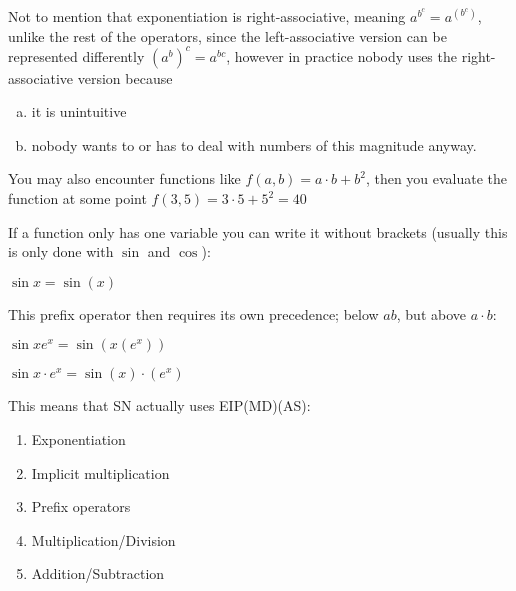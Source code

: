 \documentclass[twoside]{article}
\newcommand{\B}[1]{\left(#1\right)} %
\begin{document}
\begin{multicols*}{2}
                Not to mention that exponentiation is right-associative,
                meaning $a^{b^c} = a^{\B{b^c}}$, unlike the rest of the operators,
                since the left-associative version can be represented differently $(a^b)^c = a^{bc}$,
                however in practice nobody uses the right-associative version because
                \begin{enumerate}[a)]
                    \item it is unintuitive
                    \item nobody wants to or has to deal with numbers of this magnitude anyway.
                \end{enumerate}
            \par\vspace{5px}
                You may also encounter functions like $ f(a, b) = a \cdot b + b^2 $,
                then you evaluate the function at some point $ f(3,5) = 3\cdot5 + 5^2 = 40 $
                \par
                If a function only has one variable you can write it without brackets
                (usually this is only done with $\sin$ and $\cos$):\vspace{2px}\\
                \centerline{$ \sin x = \sin(x) $}
                This prefix operator then requires its own precedence; below $ab$, but above $a\cdot{}b$:\vspace{2px}\\
                \centerline{$ \sin xe^x = \sin(x(e^x)) $}
                \centerline{$ \sin x \cdot e^x = \sin(x) \cdot (e^x) $}
            \par\vspace{5px}
                This means that SN actually uses EIP(MD)(AS):
                \begin{enumerate}[1.]
                    \item Exponentiation
                    \item Implicit multiplication
                    \item Prefix operators
                    \item Multiplication/Division
                    \item Addition/Subtraction
                \end{enumerate}

\end{multicols*}
\end{document}
